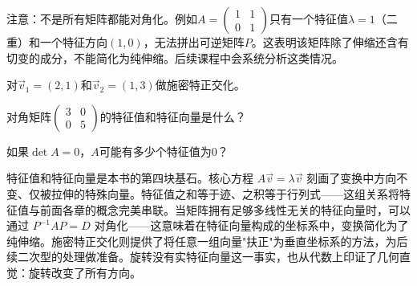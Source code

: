 注意：不是所有矩阵都能对角化。例如$A=\begin{pmatrix}1&1\\0&1\end{pmatrix}$只有一个特征值$\lambda=1$（二重）和一个特征方向$(1,0)$，无法拼出可逆矩阵$P$。这表明该矩阵除了伸缩还含有切变的成分，不能简化为纯伸缩。后续课程中会系统分析这类情况。

\begin{exercise}
\item 对$\vec v_1=(2,1)$和$\vec v_2=(1,3)$做施密特正交化。
\item 对角矩阵$\begin{pmatrix}3&0\\0&5\end{pmatrix}$的特征值和特征向量是什么？
\item 如果$\det A=0$，$A$可能有多少个特征值为$0$？
\end{exercise}


特征值和特征向量是本书的第四块基石。核心方程 $A\vec v=\lambda\vec v$ 刻画了变换中方向不变、仅被拉伸的特殊向量。特征值之和等于迹、之积等于行列式——这组关系将特征值与前面各章的概念完美串联。当矩阵拥有足够多线性无关的特征向量时，可以通过 $P^{-1}AP=D$ 对角化——这意味着在特征向量构成的坐标系中，变换简化为了纯伸缩。施密特正交化则提供了将任意一组向量"扶正"为垂直坐标系的方法，为后续二次型的处理做准备。旋转没有实特征向量这一事实，也从代数上印证了几何直觉：旋转改变了所有方向。


